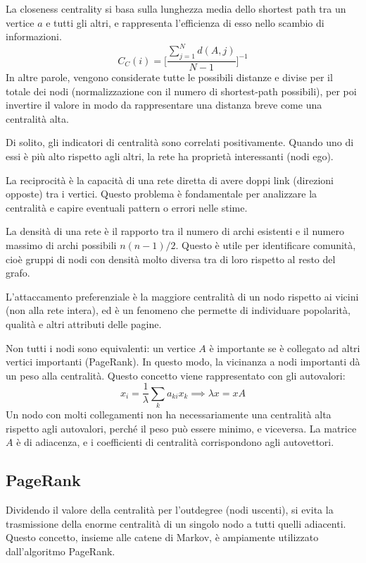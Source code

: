 La closeness centrality si basa sulla lunghezza media dello shortest path tra un vertice $a$ e tutti gli altri, e rappresenta l'efficienza di esso nello scambio di informazioni. 
$$C_C(i) = \Bigg[\frac{\sum_{j=1}^{N} d(A, j)}{N - 1}\Bigg]^{-1}$$
In altre parole, vengono considerate tutte le possibili distanze e divise per il totale dei nodi (normalizzazione con il numero di shortest-path possibili), per poi invertire il valore in modo da rappresentare una distanza breve come una centralità alta. 

Di solito, gli indicatori di centralità sono correlati positivamente. Quando uno di essi è più alto rispetto agli altri, la rete ha proprietà interessanti (nodi ego).

La reciprocità è la capacità di una rete diretta di avere doppi link (direzioni opposte) tra i vertici. Questo problema è fondamentale per analizzare la centralità e capire eventuali pattern o errori nelle stime. 

La densità di una rete è il rapporto tra il numero di archi esistenti e il numero massimo di archi possibili $n(n - 1) / 2$. Questo è utile per identificare comunità, cioè gruppi di nodi con densità molto diversa tra di loro rispetto al resto del grafo.

L'attaccamento preferenziale è la maggiore centralità di un nodo rispetto ai vicini (non alla rete intera), ed è un fenomeno che permette di individuare popolarità, qualità e altri attributi delle pagine. 

Non tutti i nodi sono equivalenti: un vertice $A$ è importante se è collegato ad altri vertici importanti (PageRank). In questo modo, la vicinanza a nodi importanti dà un peso alla centralità. Questo concetto viene rappresentato con gli autovalori:
$$x_i = \frac{1}{\lambda} \sum_{k} a_{ki} x_k \implies \lambda x = xA$$
Un nodo con molti collegamenti non ha necessariamente una centralità alta rispetto agli autovalori, perché il peso può essere minimo, e viceversa. La matrice $A$ è di adiacenza, e i coefficienti di centralità corrispondono agli autovettori.

\subsection{PageRank}
Dividendo il valore della centralità per l'outdegree (nodi uscenti), si evita la trasmissione della enorme centralità di un singolo nodo a tutti quelli adiacenti. Questo concetto, insieme alle catene di Markov, è ampiamente utilizzato dall'algoritmo PageRank.


